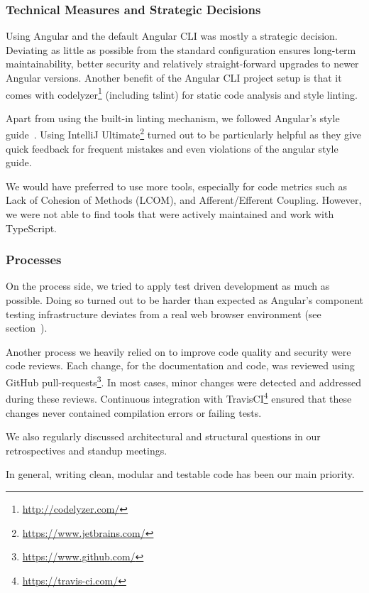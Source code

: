 \subsubsection{Technical Measures and Strategic Decisions}
Using Angular and the default Angular CLI was mostly a strategic decision.
Deviating as little as possible from the standard configuration ensures long-term maintainability, better security and relatively straight-forward upgrades to newer Angular versions.
Another benefit of the Angular CLI project setup is that it comes with codelyzer\footnote{\url{http://codelyzer.com/}} (including tslint) for static code analysis and style linting.

Apart from using the built-in linting mechanism, we followed Angular's style guide~\cite{angular-style-guide}.
Using IntelliJ Ultimate\footnote{\url{https://www.jetbrains.com/}} turned out to be particularly helpful as they give quick feedback for frequent mistakes and even violations of the angular style guide.

We would have preferred to use more tools, especially for code metrics such as Lack of Cohesion of Methods (LCOM), and Afferent/Efferent Coupling.
However, we were not able to find tools that were actively maintained and work with TypeScript.

\subsubsection{Processes}

On the process side, we tried to apply test driven development as much as possible.
Doing so turned out to be harder than expected as Angular's component testing infrastructure deviates from a real web browser environment (see section~).

Another process we heavily relied on to improve code quality and security were code reviews.
Each change, for the documentation and code, was reviewed using GitHub pull-requests\footnote{\url{https://www.github.com/}}.
In most cases, minor changes were detected and addressed during these reviews.
Continuous integration with TravisCI\footnote{\url{https://travis-ci.com/}} ensured that these changes never contained compilation errors or failing tests.

We also regularly discussed architectural and structural questions in our retrospectives and standup meetings.

In general, writing clean, modular and testable code has been our main priority.

